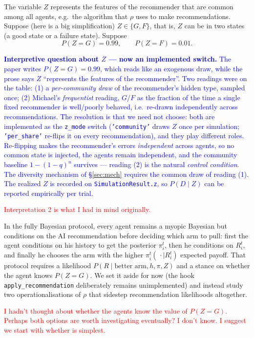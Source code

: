 \documentclass[12pt]{article}
\newcommand{\ignacio}[1]{\textcolor{blue}{#1}}
\newcommand{\michael}[1]{\textcolor{red}{#1}}
\begin{document}
The variable $Z$ represents the features of the recommender that are common among all agents, e.g.\ the algorithm that $\rho$ uses to make recommendations.
Suppose (here is a big simplification) $Z \in \{G, F\}$, that is, $Z$ can be in two states (a good state or a failure state).
Suppose
\[
  P(Z = G) = 0.99, \qquad P(Z = F) = 0.01.
\]

\ignacio{\textbf{Interpretive question about $Z$ --- now an implemented switch.} The paper writes $P(Z=G)=0.99$, which reads like an exogenous draw, while the prose says $Z$ ``represents the features of the recommender''. Two readings were on the table: (1) a \emph{per-community draw} of the recommender's hidden type, sampled once; (2) Michael's \emph{frequentist} reading, $G$/$F$ as the fraction of the time a single fixed recommender is well/poorly behaved, i.e.\ re-drawn independently across recommendations. The resolution is that we need not choose: both are implemented as the \texttt{z\_mode} switch (\texttt{'community'} draws $Z$ once per simulation; \texttt{'per\_share'} re-flips it on every recommendation), and they play different roles. Re-flipping makes the recommender's errors \emph{independent} across agents, so no common state is injected, the agents remain independent, and the community baseline $1-(1-q)^n$ survives --- reading (2) is the natural \emph{control condition}. The diversity mechanism of \S\ref{sec:mech} requires the common draw of reading (1). The realized $Z$ is recorded on \texttt{SimulationResult.z}, so $P(D \mid Z)$ can be reported empirically per trial.}

\michael{Interpretation 2 is what I had in mind originally.}


In the fully Bayesian protocol, every agent remains a myopic Bayesian but conditions on the AI recommendation before deciding which arm to pull: first the agent conditions on his history to get the posterior $\pi_i^t$, then he conditions on $R_i^t$, and finally he chooses the arm with the higher $\pi_i^t(\,\cdot \mid R_i^t)$ expected payoff. That protocol requires a likelihood $P(R \mid \text{better arm}, h, \pi, Z)$ and a stance on whether the agent knows $P(Z=G)$. We set it aside for now (the hook \texttt{apply\_recommendation} deliberately remains unimplemented) and instead study two operationalisations of $\rho$ that sidestep recommendation likelihoods altogether.

\michael{I hadn't thought about whether the agents know the value of $P(Z=G)$. Perhaps both options are worth investigating eventually? I don't know. I suggest we start with whether is simplest.}
\end{document}
